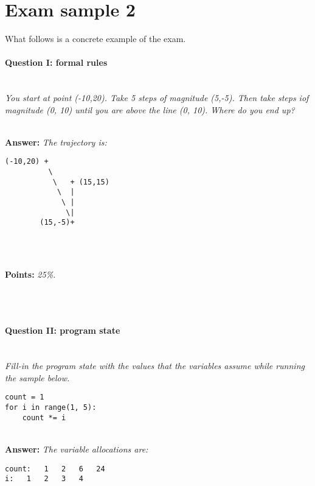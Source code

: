 \section*{Exam sample 2}
What follows is a concrete example of the exam.


\paragraph{Question I: formal rules} \ \\

\textit{You start at point (-10,20). Take 5 steps of magnitude (5,-5). Then take steps iof magnitude (0, 10) until you are above the line (0, 10). Where do you end up?}

\ \\ 

\textbf{Answer:} \textit{The trajectory is:}

\begin{lstlisting}
(-10,20) +
          \
           \   + (15,15)
            \  |
             \ |
              \|
        (15,-5)+



\end{lstlisting}

\ \\ 

\textbf{Points:} \textit{25\%.}

\ \\ 
\ \\ 

\paragraph{Question II: program state} \ \\ 

\textit{Fill-in the program state with the values that the variables assume while running the sample below.}

\begin{lstlisting}
count = 1
for i in range(1, 5):
    count *= i
\end{lstlisting}

\ \\ 

\textbf{Answer:} \textit{The variable allocations are:}
\begin{lstlisting}
count: 	 1	 2	 6	 24
i:	 1	 2	 3	 4
\end{lstlisting}

\ \\

